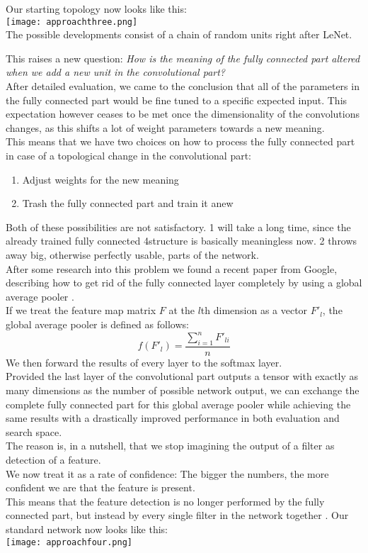 Our starting topology now looks like this:\\
\texttt{[image: approachthree.png]}\\
The possible developments consist of a chain of random units right after LeNet.

This raises a new question: \emph{How is the meaning of the fully connected part altered when we add a new unit in the convolutional part?}\\
After detailed evaluation, we came to the conclusion that all of the parameters in the fully connected part would be fine tuned to a specific expected input. This expectation however ceases to be met once the dimensionality of the convolutions changes, as this shifts a lot of weight parameters towards a new meaning.\\
This means that we have two choices on how to process the fully connected part in case of a topological change in the convolutional part:
\begin{enumerate}
	\item{Adjust weights for the new meaning}
	\item{Trash the fully connected part and train it anew}
\end{enumerate}  
Both of these possibilities are not satisfactory. 1 will take a long time, since the already trained fully connected 4structure is basically meaningless now. 2 throws away big, otherwise perfectly usable, parts of the network.\\
After some research into this problem we found a recent paper from Google, describing how to get rid of the fully connected layer completely by using a global average pooler \cite{Lin2014}.\\
If we treat the feature map matrix \(F\) at the \(l\)th dimension as a vector \(F'_l\), the global average pooler is defined as follows:
\[ f(F'_l) = \frac{\sum_{i = 1}^{n} F'_{li}}{n} \]
We then forward the results of every layer to the softmax layer.\\
Provided the last layer of the convolutional part outputs a tensor with exactly as many dimensions as the number of possible network output, we can exchange the complete fully connected part for this global average pooler while achieving the same results with a drastically improved performance in both evaluation and search space. \cite{Lin2014}\\
The reason is, in a nutshell, that we stop imagining the output of a filter as detection of a feature.\\
We now treat it as a rate of confidence: The bigger the numbers, the more confident we are that the feature is present.\\
This means that the feature detection is no longer performed by the fully connected part, but instead by every single filter in the network together \cite{Lin2014}.
Our standard network now looks like this:\\
\texttt{[image: approachfour.png]}\\

